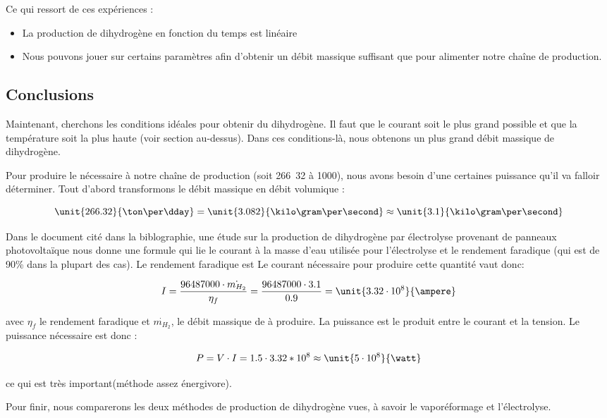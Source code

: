 Ce qui ressort de ces expériences :

\begin{itemize}
	\item La production de dihydrogène en fonction du temps est linéaire
	\item Nous pouvons jouer sur certains paramètres afin d'obtenir un débit
	massique suffisant que pour alimenter notre chaîne de production.
\end{itemize}

\subsection{Conclusions}
Maintenant, cherchons les conditions idéales pour obtenir du dihydrogène.
Il faut que le courant soit le plus grand possible et que la température
soit la plus haute (voir section au-dessus). Dans ces conditions-là, nous
obtenons un plus grand débit massique de dihydrogène.

Pour produire le  nécessaire à notre chaîne de production
(soit \unit{266.32}{\ton\per\dday} à \unit{1000}{\kelvin}), nous avons besoin d'une
certaines puissance qu'il va falloir déterminer. Tout d'abord transformons
le débit massique en débit volumique :

$$\unit{266.32}{\ton\per\dday} = \unit{3.082}{\kilo\gram\per\second} \approx \unit{3.1}{\kilo\gram\per\second}$$

Dans le document cité dans la biblographie\cite{electrolyse}, une étude sur la production
de dihydrogène par électrolyse provenant de panneaux photovoltaïque nous
donne une formule qui lie le courant à la masse d'eau utilisée pour
l'électrolyse et le rendement faradique (qui est de 90\% dans la plupart des cas).
Le rendement faradique est Le courant nécessaire pour produire cette quantité vaut donc:

$$I = \frac{96487000\cdot {\dot{m_{H_2}}}}{\eta_f} = \frac{96487000\cdot 3.1}{0.9} =  \unit{3.32\cdot 10^8}{\ampere}$$

avec $\eta_f$ le rendement faradique et $\dot{m_{H_2}}$, le débit massique
de  à produire. La puissance est le produit entre le courant et la
tension. Le puissance nécessaire est donc :

$$P = V\cdot I = 1.5\cdot 3.32*10^8 \approx \unit{5\cdot 10^8}{\watt}$$

ce qui est très important(méthode assez énergivore).

Pour finir, nous comparerons les deux méthodes de production de
dihydrogène vues, à savoir le vaporéformage et l'électrolyse.


